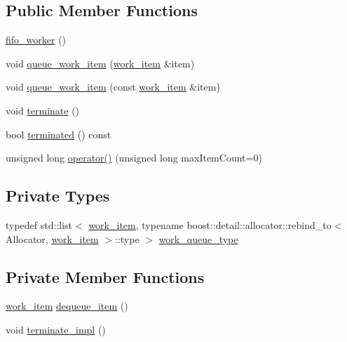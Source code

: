 \subsection*{Public Member Functions}
\begin{DoxyCompactItemize}
\item 
\mbox{\hyperlink{classboost_1_1statechart_1_1fifo__worker_a27e65c9ac66783bdf8a459f83e814946}{fifo\+\_\+worker}} ()
\item 
void \mbox{\hyperlink{classboost_1_1statechart_1_1fifo__worker_a1478832fd6093329616ddc0747674ae9}{queue\+\_\+work\+\_\+item}} (\mbox{\hyperlink{classboost_1_1statechart_1_1fifo__worker_ac90f6805565bb3e8d65e4cdde96d90c2}{work\+\_\+item}} \&item)
\item 
void \mbox{\hyperlink{classboost_1_1statechart_1_1fifo__worker_ae337753f66b8b8e9d5e473fdba656e5b}{queue\+\_\+work\+\_\+item}} (const \mbox{\hyperlink{classboost_1_1statechart_1_1fifo__worker_ac90f6805565bb3e8d65e4cdde96d90c2}{work\+\_\+item}} \&item)
\item 
void \mbox{\hyperlink{classboost_1_1statechart_1_1fifo__worker_a3010e3b8572e537865bca0158de39a5c}{terminate}} ()
\item 
bool \mbox{\hyperlink{classboost_1_1statechart_1_1fifo__worker_ac05ccf21dfcce48372f3022642e0c135}{terminated}} () const
\item 
unsigned long \mbox{\hyperlink{classboost_1_1statechart_1_1fifo__worker_a5b3bed56e4cef74649ab1f3b389600d7}{operator()}} (unsigned long max\+Item\+Count=0)
\end{DoxyCompactItemize}
\subsection*{Private Types}
\begin{DoxyCompactItemize}
\item 
typedef std\+::list$<$ \mbox{\hyperlink{classboost_1_1statechart_1_1fifo__worker_ac90f6805565bb3e8d65e4cdde96d90c2}{work\+\_\+item}}, typename boost\+::detail\+::allocator\+::rebind\+\_\+to$<$ Allocator, \mbox{\hyperlink{classboost_1_1statechart_1_1fifo__worker_ac90f6805565bb3e8d65e4cdde96d90c2}{work\+\_\+item}} $>$\+::type $>$ \mbox{\hyperlink{classboost_1_1statechart_1_1fifo__worker_a59c84b45f3d55dfdd63e7627d0fa2e7b}{work\+\_\+queue\+\_\+type}}
\end{DoxyCompactItemize}
\subsection*{Private Member Functions}
\begin{DoxyCompactItemize}
\item 
\mbox{\hyperlink{classboost_1_1statechart_1_1fifo__worker_ac90f6805565bb3e8d65e4cdde96d90c2}{work\+\_\+item}} \mbox{\hyperlink{classboost_1_1statechart_1_1fifo__worker_a63316cebc1a5e703b5e4765b577addfa}{dequeue\+\_\+item}} ()
\item 
void \mbox{\hyperlink{classboost_1_1statechart_1_1fifo__worker_ab220ce19cda37ceabc0da940109d7d05}{terminate\+\_\+impl}} ()
\end{DoxyCompactItemize}
